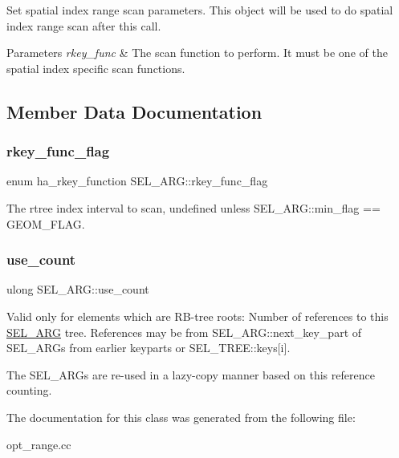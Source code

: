 Set spatial index range scan parameters. This object will be used to do spatial index range scan after this call.


\begin{DoxyParams}{Parameters}
{\em rkey\+\_\+func} & The scan function to perform. It must be one of the spatial index specific scan functions. \\
\hline
\end{DoxyParams}


\subsection{Member Data Documentation}
\mbox{\label{classSEL__ARG_a353b0fef57cae5decb392c585a6b5478}} 
\subsubsection{\texorpdfstring{rkey\+\_\+func\+\_\+flag}{rkey\_func\_flag}}
{\footnotesize\ttfamily enum ha\+\_\+rkey\+\_\+function S\+E\+L\+\_\+\+A\+R\+G\+::rkey\+\_\+func\+\_\+flag}

The rtree index interval to scan, undefined unless S\+E\+L\+\_\+\+A\+R\+G\+::min\+\_\+flag == G\+E\+O\+M\+\_\+\+F\+L\+AG. \mbox{\label{classSEL__ARG_a3b4bd5d5c82cb443d58ccfc25e1b59e7}} 
\subsubsection{\texorpdfstring{use\+\_\+count}{use\_count}}
{\footnotesize\ttfamily ulong S\+E\+L\+\_\+\+A\+R\+G\+::use\+\_\+count}

Valid only for elements which are RB-\/tree roots\+: Number of references to this \mbox{\hyperlink{classSEL__ARG}{S\+E\+L\+\_\+\+A\+RG}} tree. References may be from S\+E\+L\+\_\+\+A\+R\+G\+::next\+\_\+key\+\_\+part of S\+E\+L\+\_\+\+A\+R\+Gs from earlier keyparts or S\+E\+L\+\_\+\+T\+R\+E\+E\+::keys\mbox{[}i\mbox{]}.

The S\+E\+L\+\_\+\+A\+R\+Gs are re-\/used in a lazy-\/copy manner based on this reference counting. 

The documentation for this class was generated from the following file\+:\begin{DoxyCompactItemize}
\item 
opt\+\_\+range.\+cc\end{DoxyCompactItemize}
